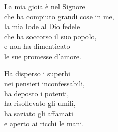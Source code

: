 

\spazio

\strofa La mia gioia è nel Signore\\
che ha compiuto grandi cose in me,\\
la mia lode al Dio fedele\\
che ha soccorso il suo popolo,\\
e non ha dimenticato\\
le sue promesse d’amore.

\spazio


\spazio

\strofa Ha disperso i superbi\\
nei pensieri inconfessabili,\\
ha deposto i potenti,\\
ha risollevato gli umili,\\
ha saziato gli affamati\\
e aperto ai ricchi le mani.

\spazio

